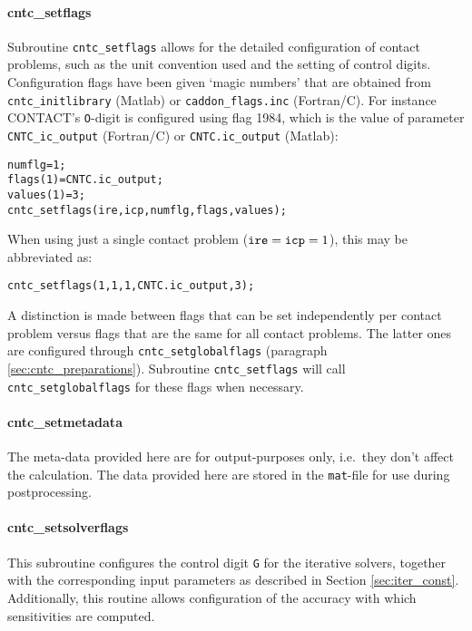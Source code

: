 \documentclass[12pt]{report}
\begin{document}
\paragraph{cntc\_setflags}

Subroutine {\tt cntc\_setflags} allows for the detailed configuration of
contact problems, such as the unit convention used and the setting of
control digits. Configuration flags have been given `magic numbers' that
are obtained from {\tt cntc\_initlibrary} (Matlab) or {\tt caddon\_flags\-.inc}
(Fortran/C). For instance CONTACT's {\tt O}-digit is configured using flag
1984, which is the value of parameter {\tt CNTC\_ic\_output} (Fortran/C) or
{\tt CNTC.ic\_output} (Matlab):
\begin{alltt}\small
    numflg    = 1;              % configure O = 3 in the CONTACT library
    flags(1)  = CNTC.ic_output;
    values(1) = 3;
    cntc_setflags(ire, icp, numflg, flags, values);
\end{alltt}
When using just a single contact problem (${\tt ire}={\tt icp}=1$), this
may be abbreviated as:
\begin{alltt}\small
    cntc_setflags(1, 1, 1, CNTC.ic_output, 3);
\end{alltt}
A distinction is made between flags that can be set independently per
contact problem versus flags that are the same for all contact problems.
The latter ones are configured through {\tt cntc\_\-set\-glo\-bal\-flags}
(paragraph \ref{sec:cntc_preparations}). Subroutine {\tt cntc\_\-set\-flags}
will call {\tt cntc\_\-set\-glo\-bal\-flags} for these flags when necessary.

\paragraph{cntc\_setmetadata}

The meta-data provided here are for output-purposes only, i.e.\ they don't
affect the calculation. The data provided here are stored in the 
{\tt mat}-file for use during postprocessing.

\paragraph{cntc\_setsolverflags}

This subroutine configures the control digit {\tt G} for the
iterative solvers, together with the corresponding input parameters as
described in Section \ref{sec:iter_const}. Additionally, this routine allows
configuration of the accuracy with which sensitivities are computed.
\end{document}
